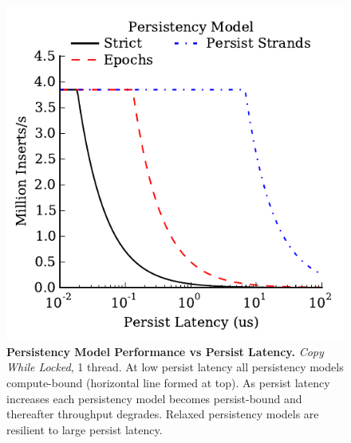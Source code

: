 \begin{figure}
  \centering
  \includegraphics[width=.55\linewidth]{PersistencyEval/Latency1Thread.pdf}
  \caption{\textbf{Persistency Model Performance vs Persist Latency.} \emph{Copy While Locked}, 1 thread.  At low persist latency all persistency models compute-bound (horizontal line formed at top).  As persist latency increases each persistency model becomes persist-bound and thereafter throughput degrades.  Relaxed persistency models are resilient to large persist latency.}
  \label{fig::RelaxedPerformance}
\end{figure}
